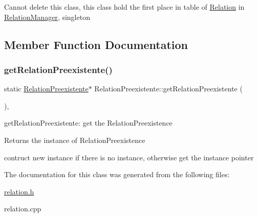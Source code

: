 Cannot delete this class, this class hold the first place in table of \hyperlink{class_relation}{Relation} in \hyperlink{class_relation_manager}{Relation\+Manager}, singleton 

\subsection{Member Function Documentation}
\mbox{\label{class_relation_preexistente_afd2c7ee8104d9dee00b52e5af1f5ed59}} 
\subsubsection{\texorpdfstring{get\+Relation\+Preexistente()}{getRelationPreexistente()}}
{\footnotesize\ttfamily static \hyperlink{class_relation_preexistente}{Relation\+Preexistente}$\ast$ Relation\+Preexistente\+::get\+Relation\+Preexistente (\begin{DoxyParamCaption}{ }\end{DoxyParamCaption})\hspace{0.3cm}{\ttfamily [inline]}, {\ttfamily [static]}}



get\+Relation\+Preexistente\+: get the Relation\+Preexistence 

\begin{DoxyReturn}{Returns}
the instance of Relation\+Preexistence
\end{DoxyReturn}
contruct new instance if there is no instance, otherwise get the instance pointer 

The documentation for this class was generated from the following files\+:\begin{DoxyCompactItemize}
\item 
\hyperlink{relation_8h}{relation.\+h}\item 
relation.\+cpp\end{DoxyCompactItemize}
